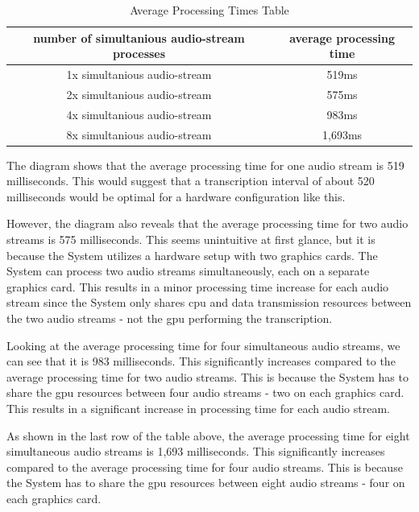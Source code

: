 \begin{table}[ht]
	\begin{center}
		\begin{tabular}{ |c|c| } 
			\hline
			number of simultanious audio-stream processes & average processing time \\
			\hline\hline
			1x simultanious audio-stream & 519ms \\
			\hline
			2x simultanious audio-stream & 575ms \\
			\hline
			4x simultanious audio-stream & 983ms \\
			\hline
			8x simultanious audio-stream & 1,693ms \\
			\hline
		\end{tabular}
	\end{center}
	\caption{Average Processing Times Table}
	\label{tab:avgProcessingTimesTable}
\end{table}

\pagebreak

The diagram shows that the average processing time for one audio stream is 519 milliseconds. This would suggest that a 
transcription interval of about 520 milliseconds would be optimal for a hardware configuration like this. 

However, the diagram also reveals that the average processing time for two audio streams is 575 milliseconds. This 
seems unintuitive at first glance, but it is because the System utilizes a hardware setup with two graphics cards. 
The System can process two audio streams simultaneously, each on a separate graphics card. This results in a minor 
processing time increase for each audio stream since the System only shares \ac{cpu} and data transmission resources 
between the two audio streams - not the \ac{gpu} performing the transcription.

Looking at the average processing time for four simultaneous audio streams, we can see that it is 983 milliseconds. 
This significantly increases compared to the average processing time for two audio streams. This is because the System 
has to share the \ac{gpu} resources between four audio streams - two on each graphics card. This results in a 
significant increase in processing time for each audio stream.

As shown in the last row of the table above, the average processing time for eight simultaneous audio streams is 
1,693 milliseconds. This significantly increases compared to the average processing time for four audio streams. 
This is because the System has to share the \ac{gpu} resources between eight audio streams - four on each graphics card.


